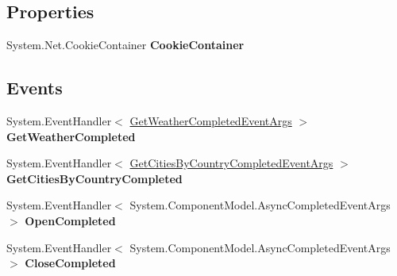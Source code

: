 \subsection*{Properties}
\begin{DoxyCompactItemize}
\item 
\hypertarget{class_silverlight_showcase_1_1_sample_weather_service_1_1_global_weather_soap_client_a381e84e109c40e453541f7cfd1d3b1f3}{
System.Net.CookieContainer {\bfseries CookieContainer}}
\label{class_silverlight_showcase_1_1_sample_weather_service_1_1_global_weather_soap_client_a381e84e109c40e453541f7cfd1d3b1f3}

\end{DoxyCompactItemize}
\subsection*{Events}
\begin{DoxyCompactItemize}
\item 
\hypertarget{class_silverlight_showcase_1_1_sample_weather_service_1_1_global_weather_soap_client_ad12fef5ac0bef6f794c6a4763a75851c}{
System.EventHandler$<$ \hyperlink{class_silverlight_showcase_1_1_sample_weather_service_1_1_get_weather_completed_event_args}{GetWeatherCompletedEventArgs} $>$ {\bfseries GetWeatherCompleted}}
\label{class_silverlight_showcase_1_1_sample_weather_service_1_1_global_weather_soap_client_ad12fef5ac0bef6f794c6a4763a75851c}

\item 
\hypertarget{class_silverlight_showcase_1_1_sample_weather_service_1_1_global_weather_soap_client_ab3e2e3a0b1a6199fd658b8880ac427be}{
System.EventHandler$<$ \hyperlink{class_silverlight_showcase_1_1_sample_weather_service_1_1_get_cities_by_country_completed_event_args}{GetCitiesByCountryCompletedEventArgs} $>$ {\bfseries GetCitiesByCountryCompleted}}
\label{class_silverlight_showcase_1_1_sample_weather_service_1_1_global_weather_soap_client_ab3e2e3a0b1a6199fd658b8880ac427be}

\item 
\hypertarget{class_silverlight_showcase_1_1_sample_weather_service_1_1_global_weather_soap_client_a2ab0a8d7ea838350158496cf18612239}{
System.EventHandler$<$ System.ComponentModel.AsyncCompletedEventArgs $>$ {\bfseries OpenCompleted}}
\label{class_silverlight_showcase_1_1_sample_weather_service_1_1_global_weather_soap_client_a2ab0a8d7ea838350158496cf18612239}

\item 
\hypertarget{class_silverlight_showcase_1_1_sample_weather_service_1_1_global_weather_soap_client_a47b1e42dd038ca265c977fd0535c9211}{
System.EventHandler$<$ System.ComponentModel.AsyncCompletedEventArgs $>$ {\bfseries CloseCompleted}}
\label{class_silverlight_showcase_1_1_sample_weather_service_1_1_global_weather_soap_client_a47b1e42dd038ca265c977fd0535c9211}

\end{DoxyCompactItemize}


